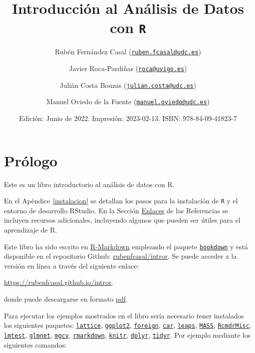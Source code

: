 \documentclass[
]{book}
\title{Introducción al Análisis de Datos con \texttt{R}}
\author{Rubén Fernández Casal (\href{mailto:ruben.fcasal@udc.es}{\nolinkurl{ruben.fcasal@udc.es}}) \and Javier Roca-Pardiñas (\href{mailto:roca@uvigo.es}{\nolinkurl{roca@uvigo.es}}) \and Julián Costa Bouzas (\href{mailto:julian.costa@udc.es}{\nolinkurl{julian.costa@udc.es}}) \and Manuel Oviedo de la Fuente (\href{mailto:manuel.oviedo@udc.es}{\nolinkurl{manuel.oviedo@udc.es}})}
\date{Edición: Junio de 2022. Impresión: 2023-02-13. ISBN: 978-84-09-41823-7}
\theoremstyle{break}
\theoremstyle{nonumberplain}
\begin{document}
\maketitle

{
\setcounter{tocdepth}{1}
\tableofcontents
}
\hypertarget{pruxf3logo}{%
\chapter*{Prólogo}\label{pruxf3logo}}

Este es un libro introductorio al análisis de datos con R.

En el Apéndice \ref{instalacion} se detallan los pasos para la instalación de \texttt{R} y el entorno de desarrollo RStudio.
En la Sección \protect\hyperlink{links}{Enlaces} de las Referencias se incluyen recursos adicionales, incluyendo algunos que pueden ser útiles para el aprendizaje de R.

Este libro ha sido escrito en \href{http://rmarkdown.rstudio.com}{R-Markdown} empleando el paquete \href{https://bookdown.org/yihui/bookdown/}{\texttt{bookdown}} y está disponible en el repositorio Github: \href{https://github.com/rubenfcasal/book_remuestreo}{rubenfcasal/intror}.
Se puede acceder a la versión en línea a través del siguiente enlace:

\url{https://rubenfcasal.github.io/intror}.

donde puede descargarse en formato \href{https://rubenfcasal.github.io/intror/Intro_Analisis_Datos_R.pdf}{pdf}.

Para ejecutar los ejemplos mostrados en el libro sería necesario tener instalados los siguientes paquetes:
\href{https://CRAN.R-project.org/package=lattice}{\texttt{lattice}}, \href{https://CRAN.R-project.org/package=ggplot2}{\texttt{ggplot2}}, \href{https://CRAN.R-project.org/package=foreign}{\texttt{foreign}}, \href{https://CRAN.R-project.org/package=car}{\texttt{car}}, \href{https://CRAN.R-project.org/package=leaps}{\texttt{leaps}}, \href{https://CRAN.R-project.org/package=MASS}{\texttt{MASS}}, \href{https://CRAN.R-project.org/package=RcmdrMisc}{\texttt{RcmdrMisc}}, \href{https://CRAN.R-project.org/package=lmtest}{\texttt{lmtest}}, \href{https://CRAN.R-project.org/package=glmnet}{\texttt{glmnet}}, \href{https://CRAN.R-project.org/package=mgcv}{\texttt{mgcv}}, \href{https://CRAN.R-project.org/package=rmarkdown}{\texttt{rmarkdown}}, \href{https://CRAN.R-project.org/package=knitr}{\texttt{knitr}}, \href{https://CRAN.R-project.org/package=dplyr}{\texttt{dplyr}}, \href{https://CRAN.R-project.org/package=tidyr}{\texttt{tidyr}}.
Por ejemplo mediante los siguientes comandos:
\end{document}

